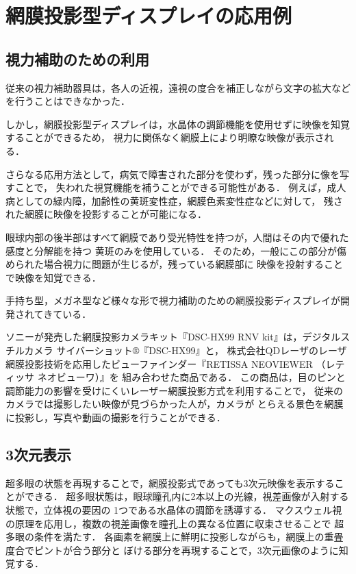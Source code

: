 \documentclass[dvipdfmx]{ujarticle}
\begin{document}
\cite{FIT2002}
\cite{ITE2011}
\cite{ITE2016}

\section{網膜投影型ディスプレイの応用例}
\subsection{視力補助のための利用}
従来の視力補助器具は，各人の近視，遠視の度合を補正しながら文字の拡大などを行うことはできなかった．

しかし，網膜投影型ディスプレイは，水晶体の調節機能を使用せずに映像を知覚することができるため，
視力に関係なく網膜上により明瞭な映像が表示される．

さらなる応用方法として，病気で障害された部分を使わず，残った部分に像を写すことで，
失われた視覚機能を補うことができる可能性がある．
例えば，成人病としての緑内障，加齢性の黄斑変性症，網膜色素変性症などに対して，
残された網膜に映像を投影することが可能になる．

眼球内部の後半部はすべて網膜であり受光特性を持つが，人間はその内で優れた感度と分解能を持つ
黄斑のみを使用している．
そのため，一般にこの部分が傷められた場合視力に問題が生じるが，残っている網膜部に
映像を投射することで映像を知覚できる．

手持ち型，メガネ型など様々な形で視力補助のための網膜投影ディスプレイが開発されてきている．

\cite{ITE2011}
\cite{MedApp}

ソニーが発売した網膜投影カメラキット『DSC-HX99 RNV kit』は，デジタルスチルカメラ サイバーショット®『DSC-HX99』と，
株式会社QDレーザのレーザ網膜投影技術を応用したビューファインダー『RETISSA NEOVIEWER （レティッサ ネオビューワ）』を
組み合わせた商品である．
この商品は，目のピンと調節能力の影響を受けにくいレーザー網膜投影方式を利用することで，
従来のカメラでは撮影したい映像が見づらかった人が，カメラが
とらえる景色を網膜に投影し，写真や動画の撮影を行うことができる．

\cite{sony}

\subsection{3次元表示}
超多眼の状態を再現することで，網膜投影式であっても3次元映像を表示することができる．
超多眼状態は，眼球瞳孔内に2本以上の光線，視差画像が入射する状態で，立体視の要因の
1つである水晶体の調節を誘導する．
マクスウェル視の原理を応用し，複数の視差画像を瞳孔上の異なる位置に収束させることで
超多眼の条件を満たす．
各画素を網膜上に鮮明に投影しながらも，網膜上の重畳度合でピントが合う部分と
ぼける部分を再現することで，3次元画像のように知覚する．
\end{document}

